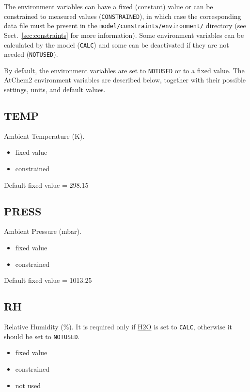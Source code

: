 The environment variables can have a fixed (constant) value or can be
constrained to measured values (\texttt{CONSTRAINED}), in which case
the corresponding data file must be present in the
\texttt{model/constraints/environment/} directory (see
Sect.~\ref{sec:constraints} for more information). Some environment
variables can be calculated by the model (\texttt{CALC}) and some can
be deactivated if they are not needed (\texttt{NOTUSED}).

By default, the environment variables are set to \texttt{NOTUSED} or
to a fixed value. The AtChem2 environment variables are described
below, together with their possible settings, units, and default
values.

\subsection{TEMP} \label{subsec:temp}

Ambient Temperature (K).

\begin{itemize}
\item fixed value
\item constrained
\end{itemize}

Default fixed value = 298.15

\subsection{PRESS} \label{subsec:press}

Ambient Pressure (mbar).

\begin{itemize}
\item fixed value
\item constrained
\end{itemize}

Default fixed value = 1013.25

\subsection{RH} \label{subsec:rh}

Relative Humidity (\%). It is required only if
\hyperref[subsec:h2o]{H2O} is set to \texttt{CALC}, otherwise it
should be set to \texttt{NOTUSED}.

\begin{itemize}
\item fixed value
\item constrained
\item not used
\end{itemize}

